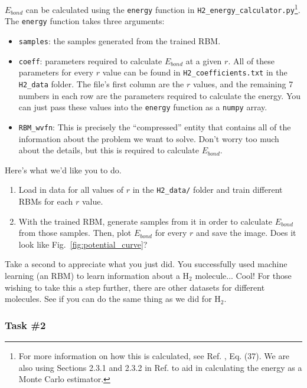 \documentclass[12pt]{article}
\begin{document}
$E_{bond}$ can be calculated using the \texttt{energy} function in \texttt{H2\_energy\_calculator.py}\footnote{For more information on how this is calculated, see Ref.      \cite{xiaElectronicStructureCalculations2017}, Eq. (37). We are also using Sections 2.3.1 and 2.3.2 in Ref. \cite{beachQuCumberWavefunctionReconstruction2019} to aid in calculating the energy as a Monte Carlo estimator.}. The \texttt{energy} function takes three arguments: 

\begin{itemize}
    \item \texttt{samples}: the samples generated from the trained RBM.
    \item \texttt{coeff}: parameters required to calculate $E_{bond}$ at a given $r$. All of these parameters for every $r$ value can be found in \texttt{H2\_coefficients.txt} in the \texttt{H2\_data} folder. The file's first column are the $r$ values, and the remaining 7 numbers in each row are the parameters required to calculate the energy. You can just pass these values into the \texttt{energy} function as a \texttt{numpy} array. 
    \item \texttt{RBM\_wvfn}: This is precisely the ``compressed'' entity that contains all of the information about the problem we want to solve. Don't worry too much about the details, but this is required to calculate $E_{bond}$.
\end{itemize}

Here's what we'd like you to do.
\begin{enumerate}
    \item Load in data for all values of $r$ in the \texttt{H2\_data/} folder and train different RBMs for each $r$ value.
    \item With the trained RBM, generate samples from it in order to calculate $E_{bond}$ from those samples. Then, plot $E_{bond}$ for every $r$ and save the image. Does it look like Fig.~\ref{fig:potential_curve}?
\end{enumerate}
Take a second to appreciate what you just did. You successfully used machine learning (an RBM) to learn information about a H$_2$ molecule... Cool! For those wishing to take this a step further, there are other datasets for different molecules. See if you can do the same thing as we did for H$_2$.

\subsubsection*{Task \#2}
\end{document}
